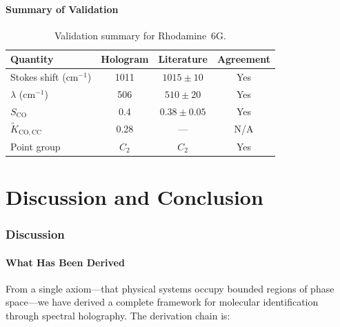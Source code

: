 \documentclass[11pt,a4paper]{article}
\theoremstyle{definition}
\theoremstyle{remark}
\begin{document}
\subsection{Summary of Validation}

\begin{table}[ht]
\centering
\caption{Validation summary for Rhodamine~6G.}
\label{tab:rhodamine_summary}
\begin{tabular}{lccc}
\toprule
Quantity & Hologram & Literature & Agreement \\
\midrule
Stokes shift (cm$^{-1}$)          & 1011  & $1015 \pm 10$    & Yes \\
$\lambda$ (cm$^{-1}$)             & 506   & $510 \pm 20$     & Yes \\
$S_{\mathrm{CO}}$                 & 0.4   & $0.38 \pm 0.05$  & Yes \\
$\tilde{K}_{\mathrm{CO,CC}}$      & 0.28  & ---              & N/A \\
Point group                        & $C_2$ & $C_2$            & Yes \\
\bottomrule
\end{tabular}
\end{table}


\part{Discussion and Conclusion}

\section{Discussion}
\label{sec:discussion}

\subsection{What Has Been Derived}

From a single axiom---that physical systems occupy bounded regions of phase space---we have derived a complete framework for molecular identification through spectral holography. The derivation chain is:
\end{document}
